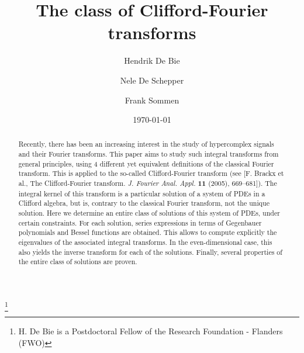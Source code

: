 \documentclass{amsart}
\theoremstyle{remark}
\begin{document}
 
\title{The class of Clifford-Fourier transforms}

\author{Hendrik De Bie}
\address{Department of Mathematical Analysis\\
Ghent University\\ Krijgslaan 281, 9000 Gent\\ Belgium.}

\author{Nele De Schepper}
\address{Department of Mathematical Analysis\\
Ghent University\\ Krijgslaan 281, 9000 Gent\\ Belgium.}

\author{Frank Sommen}
\address{Department of Mathematical Analysis\\
Ghent University\\ Krijgslaan 281, 9000 Gent\\ Belgium.}

\date{\today}
\thanks{H. De Bie is a Postdoctoral Fellow of the Research Foundation - Flanders (FWO)} 

\begin{abstract}
Recently, there has been an increasing interest in the study of hypercomplex signals and their Fourier transforms. This paper aims to study such integral transforms from general principles, using 4 different yet equivalent definitions of the classical Fourier transform. This is applied to the so-called Clifford-Fourier transform (see [F. Brackx et al., The Clifford-Fourier transform. {\em J. Fourier Anal. Appl.} {\bf 11} (2005), 669--681]). The integral kernel of this transform is a particular solution of a system of PDEs in a Clifford algebra, but is, contrary to the classical Fourier transform, not the unique solution. Here we determine an entire class of solutions of this system of PDEs, under certain constraints. For each solution, series expressions in terms of Gegenbauer polynomials and Bessel functions are obtained. This allows to compute explicitly the eigenvalues of the associated integral transforms. In the even-dimensional case, this also yields the inverse transform for each of the solutions. Finally, several properties of the entire class of solutions are proven.
\end{abstract}

\maketitle
\end{document}
